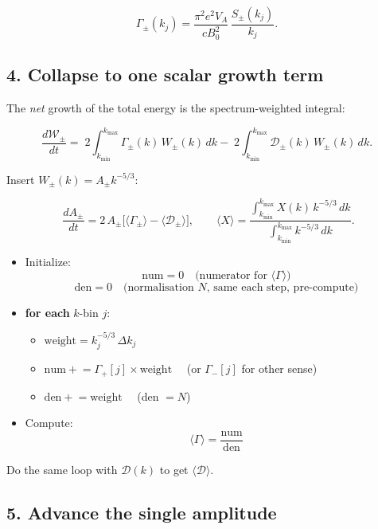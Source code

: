 $$
\Gamma_\pm(k_j)=\frac{\pi^{2}e^{2}V_A}{cB_0^{2}}\,
\frac{S_\pm(k_j)}{k_j}.
$$



\subsection{ 4.  Collapse to one scalar growth term}

The {\it net} growth of the total energy is the spectrum-weighted integral:

$$
\frac{d\mathcal W_\pm}{dt}
=\;2\!\int_{k_{\min}}^{k_{\max}}\!\Gamma_\pm(k)\,W_\pm(k)\,dk
-\;2\!\int_{k_{\min}}^{k_{\max}}\!\mathcal D_\pm(k)\,W_\pm(k)\,dk .
$$

Insert $W_\pm(k)=A_\pm k^{-5/3}$:

$$
\boxed{\;
\frac{dA_\pm}{dt}=2\,A_\pm
\bigl[\langle\Gamma_\pm\rangle - \langle\mathcal D_\pm\rangle\bigr]},
\qquad
\langle X\rangle=
\frac{\displaystyle\int_{k_{\min}}^{k_{\max}}X(k)\,k^{-5/3}\,dk}
     {\displaystyle\int_{k_{\min}}^{k_{\max}}k^{-5/3}\,dk } .
$$

\begin{tcolorbox}[colframe=black, colback=white, title=Weighted Average Growth Rate]
\begin{itemize}
    \item Initialize:
    \[
    \text{num} = 0 \quad \text{(numerator for } \langle \Gamma \rangle \text{)}
    \]
    \[
    \text{den} = 0 \quad \text{(normalisation } N \text{, same each step, pre-compute)}
    \]
    \item \textbf{for each} \( k \)-bin \( j \):
    \begin{itemize}
        \item \( \text{weight} = k_j^{-5/3} \, \Delta k_j \)
        \item \( \text{num} \mathrel{+}= \Gamma_{+}[j] \times \text{weight} \quad \) (or \( \Gamma_{-}[j] \) for other sense)
        \item \( \text{den} \mathrel{+}= \text{weight} \quad \) (den \( = N \))
    \end{itemize}
    \item Compute:
    \[
    \langle \Gamma \rangle = \frac{\text{num}}{\text{den}}
    \]
\end{itemize}
\end{tcolorbox}

Do the same loop with $\mathcal D(k)$ to get $\langle\mathcal D\rangle$.

\subsection{5.  Advance the single amplitude}

